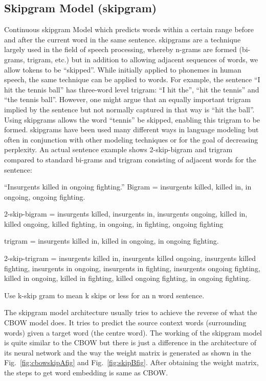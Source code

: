 \documentclass[conference]{IEEEtran}
\begin{document}
\subsection {Skipgram Model (skipgram)}
Continuous skipgram Model which predicts words within a certain range before and after the current word in the same sentence. skipgrams are a technique largely used in the field of speech processing, whereby n-grams are formed (bi-grams, trigram, etc.) but in addition to allowing adjacent sequences of words, we allow tokens to be ``skipped''. While initially applied to phonemes in human speech, the same technique can be applied to words. For example, the sentence ``I hit the tennis ball'' has three-word level trigram: ``I hit the'', ``hit the tennis'' and ``the tennis ball''. However, one might argue that an equally important trigram implied by the sentence but not normally captured in that way is ``hit the ball''. Using skipgrams allows the word ``tennis'' be skipped, enabling this trigram to be formed. skipgrams have been used many different ways in language modeling but often in conjunction with other modeling techniques or for the goal of decreasing perplexity.
An actual sentence example shows 2-skip-bigram and trigram compared to standard bi-grams and trigram consisting of adjacent words for the sentence:

“Insurgents killed in ongoing fighting.”
Bigram = {insurgents killed, killed in, in ongoing, ongoing fighting}.

2-skip-bigram = {insurgents killed, insurgents in, insurgents ongoing, killed in, killed ongoing, killed
fighting, in ongoing, in fighting, ongoing fighting}

trigram = {insurgents killed in, killed in ongoing, in ongoing fighting}.

2-skip-trigram = {insurgents killed in, insurgents killed ongoing, insurgents killed fighting, insurgents in ongoing, insurgents in fighting, insurgents ongoing fighting, killed in ongoing, killed in fighting, killed ongoing fighting, in ongoing fighting}. 

Use k-skip gram to mean k skips or less for an n word sentence.

The skipgram model architecture usually tries to achieve the reverse of what the CBOW model does. It tries to predict the source context words (surrounding words) given a target word (the centre word). The working of the skipgram model is quite similar to the CBOW but there is just a difference in the architecture of its neural network and the way the weight matrix is generated as shown in the Fig.~\ref{fig:cbowskipAfig} and Fig.~\ref{fig:skipBfig}. After obtaining the weight matrix, the steps to get word embedding is same as CBOW.
\end{document}
